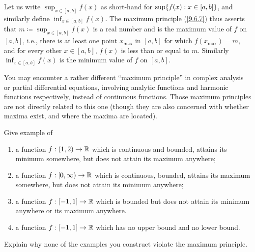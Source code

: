 \begin{note}
  Let us write \(\sup_{x \in [a, b]} f(x)\) as short-hand for \(\sup\set{f(x) : x \in [a, b]}\), and similarly define \(\inf_{x \in [a, b]} f(x)\).
  The maximum principle (\cref{9.6.7}) thus asserts that \(m \coloneqq \sup_{x \in [a, b]} f(x)\) is a real number and is the maximum value of \(f\) on \([a, b]\), i.e., there is at least one point \(x_{\max}\) in \([a, b]\) for which \(f(x_{\max}) = m\), and for every other \(x \in [a, b]\), \(f(x)\) is less than or equal to \(m\).
  Similarly \(\inf_{x \in [a, b]} f(x)\) is the minimum value of \(f\) on \([a, b]\).
\end{note}

\begin{rmk}\label{9.6.9}
  You may encounter a rather different ``maximum principle'' in complex analysis or partial differential equations, involving analytic functions and harmonic functions respectively, instead of continuous functions.
  Those maximum principles are not directly related to this one
  (though they are also concerned with whether maxima exist, and where the maxima are located).
\end{rmk}

\exercisesection

\begin{ex}\label{ex:9.6.1}
  Give example of
  \begin{enumerate}
    \item a function \(f : (1, 2) \to \mathbb{R}\) which is continuous and bounded, attains its minimum somewhere, but does not attain its maximum anywhere;
    \item a function \(f : [0, \infty) \to \mathbb{R}\) which is continuous, bounded, attains its maximum somewhere, but does not attain its minimum anywhere;
    \item a function \(f : [-1, 1] \to \mathbb{R}\) which is bounded but does not attain its minimum anywhere or its maximum anywhere.
    \item a function \(f : [-1, 1] \to \mathbb{R}\) which has no upper bound and no lower bound.
  \end{enumerate}
  Explain why none of the examples you construct violate the maximum principle.
\end{ex}

